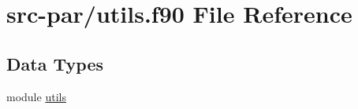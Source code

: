 \hypertarget{utils_8f90}{\section{src-\/par/utils.f90 File Reference}
\label{utils_8f90}
}
\subsection*{Data Types}
\begin{DoxyCompactItemize}
\item 
module \hyperlink{classutils}{utils}
\end{DoxyCompactItemize}
